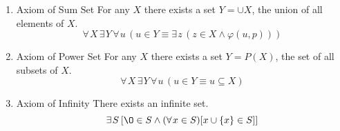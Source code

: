 \documentclass[12pt]{article}
\begin{document}
\begin{enumerate}
\item {\color{blue}Axiom of Sum Set} For any $X$ there exists a set $Y = {\cup} X$, the union of all elements of $X$.
\begin{equation}
	\forall \hspace{1pt} X  \hspace{2pt}  
	\exists \hspace{1pt} Y  \hspace{2pt}  
	\forall \hspace{1pt} u   \hspace{2pt}  
	(u \in Y \equiv \exists \hspace{1pt} z \hspace{2pt}  (z \in X \land \varphi (u, p)))	
\end{equation}


\item {\color{blue}Axiom of Power Set} For any $X$ there exists a set $Y = P (X)$, the set of all subsets of $X$.
\begin{equation}
	\forall \hspace{1pt} X  \hspace{2pt}  
	\exists \hspace{1pt} Y  \hspace{2pt}  
	\forall \hspace{1pt} u   \hspace{2pt}  
	(u \in Y \equiv u \subseteq X)	
\end{equation}


\item {\color{blue}Axiom of Infinity} There exists an infinite set.
\begin{equation}
	\exists \hspace{1pt} S \hspace{2pt}  
	[\O \in S \land (\forall \hspace{1pt} x\in S) 
	[x \cup \{x\} \in S]]
\end{equation}



\end{enumerate}
\end{document}
